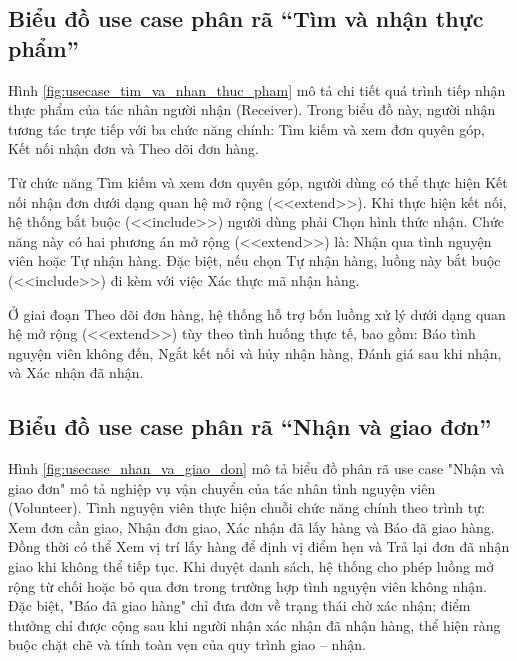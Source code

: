 \documentclass[../main.tex]{subfiles}%
\begin{document}
\subsection{Biểu đồ use case phân rã ``Tìm và nhận thực phẩm''}
\label{section:2.3.3}

\noindent\begin{minipage}{\textwidth}
    \centering
    \label{fig:usecase_tim_va_nhan_thuc_pham}
\end{minipage}
\vspace{-0.5\baselineskip}
\noindent

Hình \ref{fig:usecase_tim_va_nhan_thuc_pham} mô tả chi tiết quá trình tiếp nhận thực phẩm của tác nhân người nhận (Receiver). Trong biểu đồ này, người nhận tương tác trực tiếp với ba chức năng chính: Tìm kiếm và xem đơn quyên góp, Kết nối nhận đơn và Theo dõi đơn hàng.

Từ chức năng Tìm kiếm và xem đơn quyên góp, người dùng có thể thực hiện Kết nối nhận đơn dưới dạng quan hệ mở rộng (<<extend>>). Khi thực hiện kết nối, hệ thống bắt buộc (<<include>>) người dùng phải Chọn hình thức nhận. Chức năng này có hai phương án mở rộng (<<extend>>) là: Nhận qua tình nguyện viên hoặc Tự nhận hàng. Đặc biệt, nếu chọn Tự nhận hàng, luồng này bắt buộc (<<include>>) đi kèm với việc Xác thực mã nhận hàng.

Ở giai đoạn Theo dõi đơn hàng, hệ thống hỗ trợ bốn luồng xử lý dưới dạng quan hệ mở rộng (<<extend>>) tùy theo tình huống thực tế, bao gồm: Báo tình nguyện viên không đến, Ngắt kết nối và hủy nhận hàng, Đánh giá sau khi nhận, và Xác nhận đã nhận.

\subsection{Biểu đồ use case phân rã ``Nhận và giao đơn''}
\label{section:2.3.4}

\noindent\begin{minipage}{\textwidth}
    \centering
    \label{fig:usecase_nhan_va_giao_don}
\end{minipage}
\vspace{-0.5\baselineskip}

\noindent
Hình \ref{fig:usecase_nhan_va_giao_don} mô tả biểu đồ phân rã use case "Nhận và giao đơn" mô tả nghiệp vụ vận chuyển của tác nhân tình nguyện viên (Volunteer). Tình nguyện viên thực hiện chuỗi chức năng chính theo trình tự: Xem đơn cần giao, Nhận đơn giao, Xác nhận đã lấy hàng và Báo đã giao hàng. Đồng thời có thể Xem vị trí lấy hàng để định vị điểm hẹn và Trả lại đơn đã nhận giao khi không thể tiếp tục. Khi duyệt danh sách, hệ thống cho phép luồng mở rộng từ chối hoặc bỏ qua đơn trong trường hợp tình nguyện viên không nhận. Đặc biệt, "Báo đã giao hàng" chỉ đưa đơn về trạng thái chờ xác nhận; điểm thưởng chỉ được cộng sau khi người nhận xác nhận đã nhận hàng, thể hiện ràng buộc chặt chẽ và tính toàn vẹn của quy trình giao – nhận.
\end{document}
